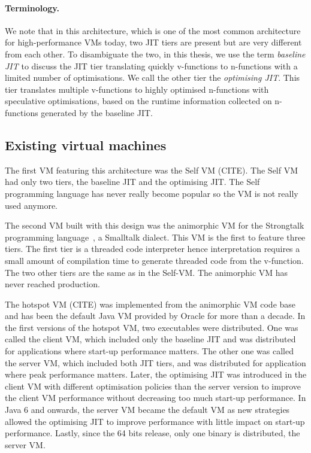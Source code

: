 \documentclass[a4paper,12pt,twoside]{../includes/ThesisStyle}
\begin{document}
\paragraph{Terminology.} We note that in this architecture, which is one of the most common architecture for high-performance VMs today, two JIT tiers are present but are very different from each other. To disambiguate the two, in this thesis, we use the term \emph{baseline JIT} to discuss the JIT tier translating quickly v-functions to n-functions with a limited number of optimisations. We call the other tier the \emph{optimising JIT}. This tier translates multiple v-functions to highly optimised n-functions with speculative optimisations, based on the runtime information collected on n-functions generated by the baseline JIT. 

\subsection{Existing virtual machines}

The first VM featuring this architecture was the Self VM (CITE). The Self VM had only two tiers, the baseline JIT and the optimising JIT. The Self programming language has never really become popular so the VM is not really used anymore. 

The second VM built with this design was the animorphic VM for the Strongtalk programming language~\cite{Sun06}, a Smalltalk dialect. This VM is the first to feature three tiers. The first tier is a threaded code interpreter hence interpretation requires a small amount of compilation time to generate threaded code from the v-function. The two other tiers are the same as in the Self-VM. The animorphic VM has never reached production.

The hotspot VM (CITE) was implemented from the animorphic VM code base and has been the default Java VM provided by Oracle for more than a decade. In the first versions of the hotspot VM, two executables were distributed. One was called the client VM, which included only the baseline JIT and was distributed for applications where start-up performance matters. The other one was called the server VM, which included both JIT tiers, and was distributed for application where peak performance matters. Later, the optimising JIT was introduced in the client VM with different optimisation policies than the server version to improve the client VM performance without decreasing too much start-up performance. In Java 6 and onwards, the server VM became the default VM as new strategies allowed the optimising JIT to improve performance with little impact on start-up performance. Lastly, since the 64 bits release, only one binary is distributed, the server VM. 
\end{document}
